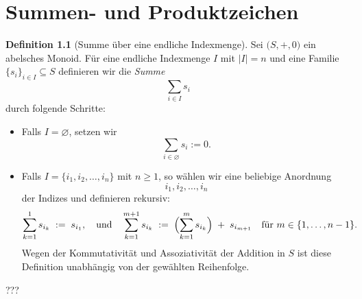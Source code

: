 \documentclass{book}
\theoremstyle{plain}
\theoremstyle{remark}
\theoremstyle{definition}
\newtheorem{definition}{Definition}[section]
\begin{document}
\chapter{Summen- und Produktzeichen}

\begin{definition}[Summe über eine endliche Indexmenge]
Sei \(\bigl(S,+,0\bigr)\) ein abelsches Monoid. Für eine endliche Indexmenge \(I\) mit \(\lvert I \rvert = n\) und eine Familie \(\{s_i\}_{i \in I}\subseteq S\) definieren wir die \emph{Summe} 
\[
  \sum_{i \in I} s_i
\]
durch folgende Schritte:
\begin{itemize}
    \item Falls \(I = \varnothing\), setzen wir
    \[
       \sum_{i \in \varnothing} s_i := 0.
    \]
    \item Falls \(I = \{i_1,i_2,\dots,i_n\}\) mit \(n \ge 1\), so wählen wir eine beliebige Anordnung 
    \[
      i_1, i_2, \dots, i_n
    \]
    der Indizes und definieren rekursiv:
    \[
      \sum_{k=1}^1 s_{i_k} \;:=\; s_{i_1}, 
      \quad\text{und}\quad
      \sum_{k=1}^{m+1} s_{i_k} \;:=\; \Bigl(\sum_{k=1}^m s_{i_k}\Bigr) \;+\; s_{i_{m+1}}
      \quad \text{für } m \in \{1,\dots,n-1\}.
    \]
    Wegen der Kommutativität und Assoziativität der Addition in \(S\) ist diese Definition unabhängig von der gewählten Reihenfolge.
\end{itemize}
\end{definition}

???
\end{document}

